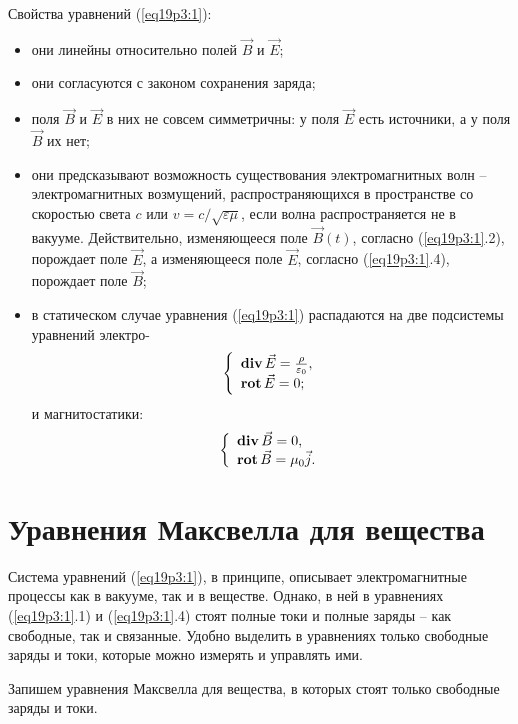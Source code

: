 	Свойства уравнений (\ref{eq19p3:1}):
	\begin{itemize}
	\item они линейны относительно полей \( \vec{B} \) и \( \vec{E} \);
	\item они согласуются с законом сохранения заряда;
	\item поля \( \vec{B} \) и \( \vec{E} \) в них не совсем симметричны: у поля
        \( \vec{E} \) есть источники, а у поля \( \vec{B} \) их нет;
	\item они предсказывают возможность существования электромагнитных волн --
        электромагнитных возмущений, распространяющихся в пространстве со
        скоростью света \( c \) или \( v = c/\sqrt{\varepsilon\mu} \),
        если волна распространяется не в вакууме. Действительно, изменяющееся
        поле \( \vec{B}(t) \), согласно (\ref{eq19p3:1}.2), порождает поле
        \( \vec{E} \), а изменяющееся поле \( \vec{E} \), согласно
        (\ref{eq19p3:1}.4), порождает поле \( \vec{B} \);
	\item в статическом случае уравнения (\ref{eq19p3:1}) распадаются на две
        подсистемы уравнений электро-
		\[
            \left\{
            \begin{array}{l}
                \mathbf{div\,}\vec{E} = \frac{\rho}{\varepsilon_0}, \\
                \mathbf{rot\,}\vec{E} = 0;
            \end{array}
            \right.
        \]
		 и магнитостатики:
		 \[
            \left\{
            \begin{array}{l}
                \mathbf{div\,}\vec{B} = 0, \\
                \mathbf{rot\,}\vec{B} = \mu_0\vec{j}.
            \end{array}
            \right.
        \]
	\end{itemize}

\section{Уравнения Максвелла для вещества}

	Система уравнений (\ref{eq19p3:1}), в принципе, описывает электромагнитные
    процессы как в вакууме, так и в веществе. Однако, в ней в уравнениях
    (\ref{eq19p3:1}.1) и (\ref{eq19p3:1}.4) стоят полные токи и полные заряды --
    как свободные, так и связанные. Удобно выделить в уравнениях только
    свободные заряды и токи, которые можно измерять и управлять ими.
	
	Запишем уравнения Максвелла для вещества, в которых стоят только свободные
    заряды и токи.
	
